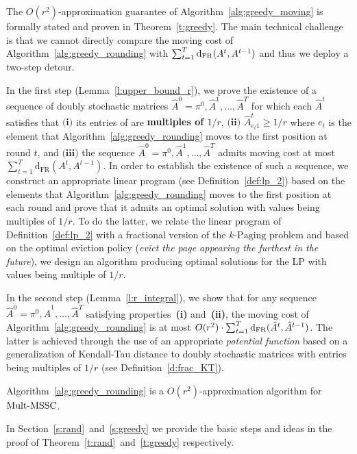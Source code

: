 \noindent The $O(r^2)$-approximation guarantee of Algorithm~\ref{alg:greedy_moving} is formally stated and proven in Theorem~\ref{t:greedy}. The main technical challenge is that we cannot directly compare the moving cost of Algorithm~\ref{alg:greedy_rounding} with $\sum_{t=1}^T \mathrm{d}_{\mathrm{FR}}(A^t,A^{t-1})$ and thus we deploy a two-step detour.

In the first step (Lemma~\ref{l:upper_bound_r}), we prove the existence of a 
sequence of doubly stochastic matrices $\hat{A}^0 =\pi^0,\hat{A}^1,\ldots,\hat{A}^T$ for which each $\hat{A}^t$ satisfies that $\textbf{(i)}$ its entries of  are \textbf{multiples of $1/r$}, $\textbf{(ii)}$ $\hat{A}^t_{e_t 1} \geq 1/r$ where $e_t$ is the element that Algorithm~\ref{alg:greedy_rounding} moves to the first position at round $t$, and $\textbf{(iii)}$ the sequence
$\hat{A}^0 =\pi^0,\hat{A}^1,\ldots,\hat{A}^T$ admits moving cost at most 
$\sum_{t=1}^T \mathrm{d}_{\mathrm{FR}}(A^t,A^{t-1})$. In order to establish the existence of such a sequence, we construct an appropriate linear program (see Definition~\ref{def:lp_2}) based on the elements 
that Algorithm~\ref{alg:greedy_rounding} moves to the first position at each round and prove that it admits an optimal solution with values being multiples of $1/r$. To do the latter, we
relate the linear program of Definition~\ref{def:lp_2} with a fractional version of the $k$-$\mathrm{Paging}$ \cite{BBN12} problem and based on the optimal eviction policy
(\textit{evict the page appearing the furthest in the future}), we design an algorithm producing optimal solutions for the LP with values being multiple of $1/r$.

In the second step (Lemma~\ref{l:r_integral}), we show that for any sequence $\hat{A}^0 =\pi^0,\hat{A}^1,\ldots,\hat{A}^T$ satisfying properties~\textbf{(i)} and~\textbf{(ii)}, the moving cost of Algorithm~\ref{alg:greedy_rounding} is at most $O(r^2) \cdot \sum_{t=1}^T \mathrm{d}_{\mathrm{FR}}(\hat{A}^t,\hat{A}^{t-1})$. The latter is achieved through the use of an appropriate \textit{potential function} based on a generalization of Kendall-Tau distance to  
doubly stochastic matrices with entries being multiples
of $1/r$ (see Definition~\ref{d:frac_KT}).
\begin{theorem}\label{t:greedy}
Algorithm~\ref{alg:greedy_rounding}
is a $O(r^2)$-approximation algorithm for $\mathrm{Mult}\text{-}\mathrm{MSSC}$.
\end{theorem}
\noindent In Section~\ref{s:rand}~and~\ref{s:greedy} we provide the basic steps and ideas in the proof of Theorem~\ref{t:rand}~and~\ref{t:greedy} respectively.